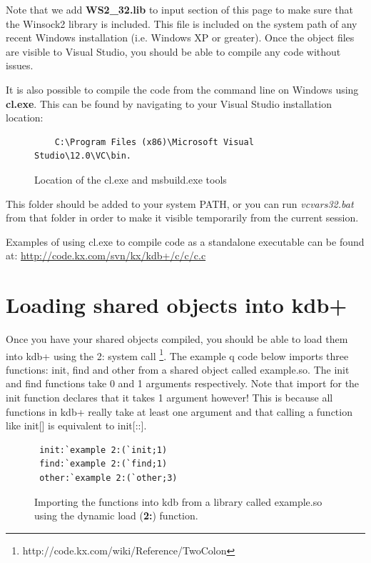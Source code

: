  Note that we add \textbf{WS2\_32.lib} to input section of this page to make sure that the Winsock2 library is included. This file is included on the system path of any recent Windows installation (i.e. Windows XP or greater). Once the object files are visible to Visual Studio, you should be able to compile any code without issues.
 
 It is also possible to compile the code from the command line on Windows using \textbf{cl.exe}. This can be found by navigating to your Visual Studio installation
 location:
 
 \begin{figure}[h]
 	\begin{lstlisting}
 	C:\Program Files (x86)\Microsoft Visual Studio\12.0\VC\bin.
 	\end{lstlisting}
 	\caption{Location of the cl.exe and msbuild.exe tools}
 \end{figure}
 
 This folder should be added to your system PATH, or you can run \textit{vcvars32.bat} from that folder in order to make it visible temporarily from the current session.
 
 Examples of using cl.exe to compile code as a standalone executable can be found at: 
 \url{http://code.kx.com/svn/kx/kdb+/c/c/c.c}
 
 \section{Loading shared objects into kdb+}
 
 Once you have your shared objects compiled, you should be able to load them into kdb+ using the 2: system call \footnote{http://code.kx.com/wiki/Reference/TwoColon}. The example q code below imports three functions: init, find and other from a shared object called example.so. The init and find functions take 0 and 1 arguments respectively. Note that import for the init function declares that it takes 1 argument however! This is because all functions in kdb+ really take at least one argument and that calling a function like init[] is equivalent to init[::].
 
 \begin{figure}[h]
 \begin{lstlisting}
 init:`example 2:(`init;1)
 find:`example 2:(`find;1)
 other:`example 2:(`other;3)
 \end{lstlisting}
 \caption{Importing the functions into kdb from a library called example.so using the dynamic load (\textbf{2:}) function.}
 \end{figure}
 
